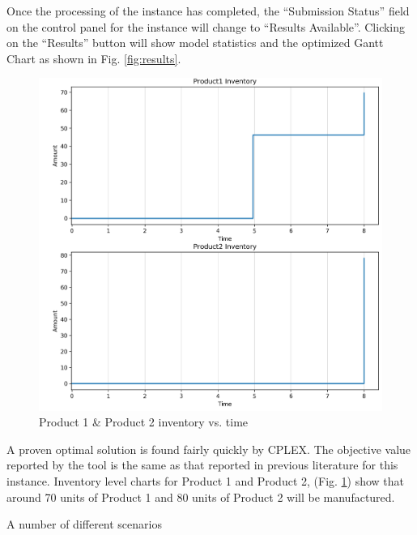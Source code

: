 Once the processing of the instance has completed, the ``Submission Status'' field on the control panel for the instance will change to ``Results Available''. Clicking on the ``Results'' button will show model statistics and the optimized Gantt Chart as shown in Fig. \ref{fig:results}.

\begin{figure}[htbp]
\centering
\includegraphics[width=\linewidth]{Images/ProductInventory.png}
\caption{Product 1 \& Product 2 inventory vs. time}
\label{fig:stateInventory}
\end{figure}

A proven optimal solution is found fairly quickly by CPLEX. The objective value reported by the tool is the same as that reported in previous literature for this instance. Inventory level charts for Product 1 and Product 2, (Fig. \ref{fig:stateInventory}) show that around 70 units of Product 1 and 80 units of Product 2 will be manufactured.

A number of different scenarios 


